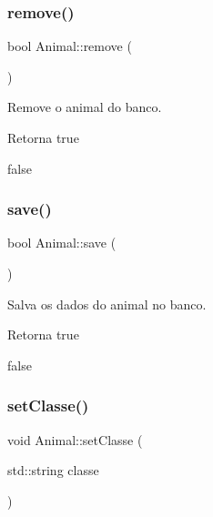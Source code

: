 \mbox{\label{classAnimal_a0aea60eaeb4d8f1d68d2c37e279d2d20}} 
\subsubsection{\texorpdfstring{remove()}{remove()}}
{\footnotesize\ttfamily bool Animal\+::remove (\begin{DoxyParamCaption}{ }\end{DoxyParamCaption})}



Remove o animal do banco. 

\begin{DoxyReturn}{Retorna}
true 

false 
\end{DoxyReturn}
\mbox{\label{classAnimal_a0733e9c19d226749195ebe9e64df8964}} 
\subsubsection{\texorpdfstring{save()}{save()}}
{\footnotesize\ttfamily bool Animal\+::save (\begin{DoxyParamCaption}{ }\end{DoxyParamCaption})}



Salva os dados do animal no banco. 

\begin{DoxyReturn}{Retorna}
true 

false 
\end{DoxyReturn}
\mbox{\label{classAnimal_ae1956de8a017d0b1cd506935cd1a57e0}} 
\subsubsection{\texorpdfstring{set\+Classe()}{setClasse()}}
{\footnotesize\ttfamily void Animal\+::set\+Classe (\begin{DoxyParamCaption}\item[{std\+::string}]{classe }\end{DoxyParamCaption})}



